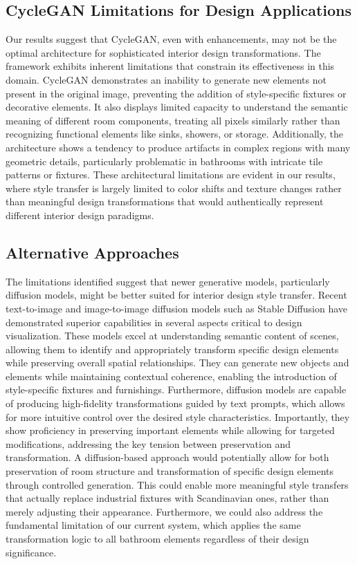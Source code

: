 \documentclass[twocolumn,superscriptaddress,aps]{revtex4-1}
\begin{document}
\subsection{CycleGAN Limitations for Design Applications}

Our results suggest that CycleGAN, even with enhancements, may not be the optimal architecture for sophisticated interior design transformations. The framework exhibits inherent limitations that constrain its effectiveness in this domain. CycleGAN demonstrates an inability to generate new elements not present in the original image, preventing the addition of style-specific fixtures or decorative elements. It also displays limited capacity to understand the semantic meaning of different room components, treating all pixels similarly rather than recognizing functional elements like sinks, showers, or storage. Additionally, the architecture shows a tendency to produce artifacts in complex regions with many geometric details, particularly problematic in bathrooms with intricate tile patterns or fixtures. These architectural limitations are evident in our results, where style transfer is largely limited to color shifts and texture changes rather than meaningful design transformations that would authentically represent different interior design paradigms.

\subsection{Alternative Approaches}

The limitations identified suggest that newer generative models, particularly diffusion models, might be better suited for interior design style transfer. Recent text-to-image and image-to-image diffusion models such as Stable Diffusion have demonstrated superior capabilities in several aspects critical to design visualization. These models excel at understanding semantic content of scenes, allowing them to identify and appropriately transform specific design elements while preserving overall spatial relationships. They can generate new objects and elements while maintaining contextual coherence, enabling the introduction of style-specific fixtures and furnishings. Furthermore, diffusion models are capable of producing high-fidelity transformations guided by text prompts, which allows for more intuitive control over the desired style characteristics. Importantly, they show proficiency in preserving important elements while allowing for targeted modifications, addressing the key tension between preservation and transformation. A diffusion-based approach would potentially allow for both preservation of room structure and transformation of specific design elements through controlled generation. This could enable more meaningful style transfers that actually replace industrial fixtures with Scandinavian ones, rather than merely adjusting their appearance. Furthermore, we could also address the fundamental limitation of our current system, which applies the same transformation logic to all bathroom elements regardless of their design significance.
\end{document}

